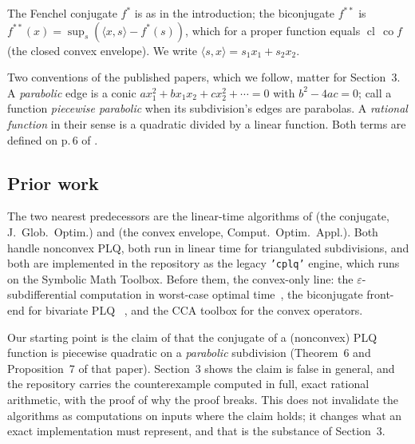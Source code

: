 \documentclass[11pt]{article}
\theoremstyle{definition}
\DeclareMathOperator{\cl}{cl}
\DeclareMathOperator{\co}{co}
\begin{document}
The Fenchel conjugate $f^*$ is as in the introduction; the biconjugate
$f^{**}$ is $f^{**}(x) = \sup_s (\langle x,s\rangle - f^*(s))$, which for a
proper function equals $\cl\,\co f$ (the closed convex envelope).
 We write $\langle s,x\rangle = s_1x_1+s_2x_2$.

Two conventions of the published papers, which we follow, matter for
Section~3. A \emph{parabolic} edge is a conic $ax_1^2+bx_1x_2+cx_2^2+\cdots=0$
with $b^2-4ac=0$; \citet{KARMARKAR-25,KARMARKAR-25a} call a function
\emph{piecewise parabolic} when its subdivision's edges are parabolas. A
\emph{rational function} in their sense is a quadratic divided by a linear
function. Both terms are defined on p.\,6 of \citet{KARMARKAR-25}.

\subsection{Prior work}

The two nearest predecessors are the linear-time algorithms of
\citet{KARMARKAR-25} (the conjugate, J.~Glob.\ Optim.) and
\citet{KARMARKAR-25a} (the convex envelope, Comput.\ Optim.\ Appl.). Both
handle nonconvex PLQ, both run in linear time for triangulated subdivisions,
and both are implemented in the repository as the legacy \texttt{'cplq'}
engine, which runs on the Symbolic Math Toolbox.
 Before them, the convex-only line: the
$\varepsilon$-subdifferential computation in worst-case optimal
time~\cite{KUMAR-18}, the biconjugate front-end for bivariate PLQ
~\cite{KUMAR-19,KUMAR-19a}, and the CCA toolbox for the convex operators.

Our starting point is the claim of \citet{KARMARKAR-25} that the conjugate of
a (nonconvex) PLQ function is piecewise quadratic on a \emph{parabolic}
subdivision (Theorem~6 and Proposition~7 of that paper). Section~3 shows the
claim is false in general, and the repository carries the counterexample
computed in full, exact rational arithmetic, with the proof of why the proof
breaks.
 This does
not invalidate the algorithms as computations on inputs where the claim holds;
it changes what an exact implementation must represent, and that is the
substance of Section~3.
\end{document}
